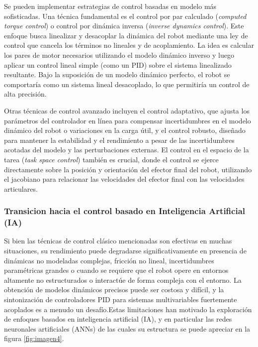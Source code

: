 \documentclass[12pt]{article}
\begin{document}
\vspace{1\baselineskip} 
Se pueden implementar estrategias de control basadas en modelo más sofisticadas. Una técnica fundamental es el control por par calculado (\textit{computed torque control}) o control por dinámica inversa (\textit{inverse dynamics control}). Este enfoque busca linealizar y desacoplar la dinámica del robot mediante una ley de control que cancela los términos no lineales y de acoplamiento. La idea es calcular los pares de motor necesarios utilizando el modelo dinámico inverso y luego aplicar un control lineal simple (como un PID) sobre el sistema linealizado resultante. Bajo la suposición de un modelo dinámico perfecto, el robot se comportaría como un sistema lineal desacoplado, lo que permitiría un control de alta precisión\cite{modern_robotics}.


Otras técnicas de control avanzado incluyen el control adaptativo, que ajusta los parámetros del controlador en línea para compensar incertidumbres en el modelo dinámico del robot o variaciones en la carga útil\cite{modern_robotis_115}, y el control robusto, diseñado para mantener la estabilidad y el rendimiento a pesar de las incertidumbres acotadas del modelo y las perturbaciones externas. El control en el espacio de la tarea (\textit{task space control}) también es crucial, donde el control se ejerce directamente sobre la posición y orientación del efector final del robot, utilizando el jacobiano para relacionar las velocidades del efector final con las velocidades articulares.

\subsubsection{Transicion hacia el control basado en Inteligencia Artificial (IA)}
Si bien las técnicas de control clásico mencionadas son efectivas en muchas situaciones, su rendimiento puede degradarse significativamente en presencia de dinámicas no modeladas complejas, fricción no lineal, incertidumbres paramétricas grandes o cuando se requiere que el robot opere en entornos altamente no estructurados o interactúe de forma compleja con el entorno. La obtención de modelos dinámicos precisos puede ser costosa y difícil, y la sintonización de controladores PID para sistemas multivariables fuertemente acoplados es a menudo un desafío.Estas limitaciones han motivado la exploración de enfoques basados en inteligencia artificial (IA), y en particular las redes neuronales artificiales (ANNs) de las cuales su estructura se puede apreciar en la figura \ref{fig:imagen4}.
\end{document}
